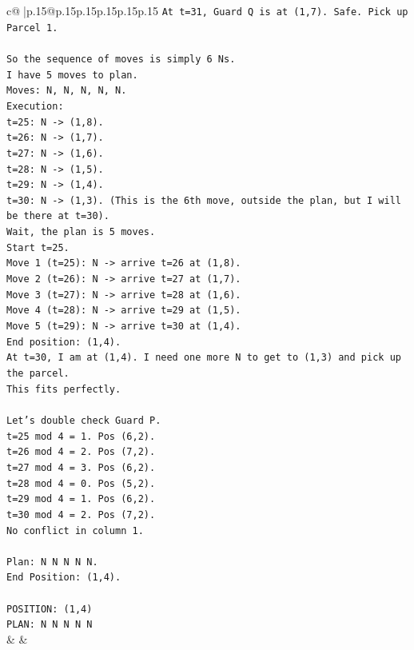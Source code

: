 \documentclass{article}
\begin{document}
{\begin{supertabular}{c@{$\;$}|p{.15\linewidth}@{}p{.15\linewidth}p{.15\linewidth}p{.15\linewidth}p{.15\linewidth}p{.15\linewidth}}
{{{\texttt{At t=31, Guard Q is at (1,7). Safe. Pick up Parcel 1.} \\
\\ 
\texttt{So the sequence of moves is simply 6 Ns.} \\
\texttt{I have 5 moves to plan.} \\
\texttt{Moves: N, N, N, N, N.} \\
\texttt{Execution:} \\
\texttt{t=25: N {-}> (1,8).} \\
\texttt{t=26: N {-}> (1,7).} \\
\texttt{t=27: N {-}> (1,6).} \\
\texttt{t=28: N {-}> (1,5).} \\
\texttt{t=29: N {-}> (1,4).} \\
\texttt{t=30: N {-}> (1,3). (This is the 6th move, outside the plan, but I will be there at t=30).} \\
\texttt{Wait, the plan is 5 moves.} \\
\texttt{Start t=25.} \\
\texttt{Move 1 (t=25): N {-}> arrive t=26 at (1,8).} \\
\texttt{Move 2 (t=26): N {-}> arrive t=27 at (1,7).} \\
\texttt{Move 3 (t=27): N {-}> arrive t=28 at (1,6).} \\
\texttt{Move 4 (t=28): N {-}> arrive t=29 at (1,5).} \\
\texttt{Move 5 (t=29): N {-}> arrive t=30 at (1,4).} \\
\texttt{End position: (1,4).} \\
\texttt{At t=30, I am at (1,4). I need one more N to get to (1,3) and pick up the parcel.} \\
\texttt{This fits perfectly.} \\
\\ 
\texttt{Let's double check Guard P.} \\
\texttt{t=25 mod 4 = 1. Pos (6,2).} \\
\texttt{t=26 mod 4 = 2. Pos (7,2).} \\
\texttt{t=27 mod 4 = 3. Pos (6,2).} \\
\texttt{t=28 mod 4 = 0. Pos (5,2).} \\
\texttt{t=29 mod 4 = 1. Pos (6,2).} \\
\texttt{t=30 mod 4 = 2. Pos (7,2).} \\
\texttt{No conflict in column 1.} \\
\\ 
\texttt{Plan: N N N N N.} \\
\texttt{End Position: (1,4).} \\
\\ 
\texttt{POSITION: (1,4)} \\
\texttt{PLAN: N N N N N} \\
            }
        }
    }
    & & \\ \\


\end{supertabular}}
\end{document}
